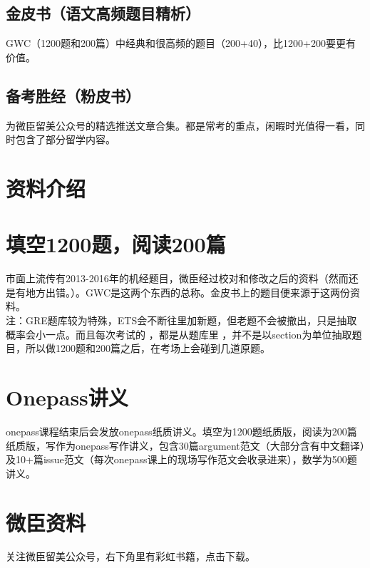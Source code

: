 \documentclass[11pt,a4paper]{article}
\begin{document}
{	\subsection{金皮书（语文高频题目精析）}GWC（1200题和200篇）中经典和很高频的题目（200+40），比1200+200要更有价值。
	
	\subsection{备考胜经（粉皮书）}为微臣留美公众号的精选推送文章合集。都是常考的重点，闲暇时光值得一看，同时包含了部分留学内容。
}
	\newpage
	
	\section{资料介绍}{
	
	\section*{填空1200题，阅读200篇}市面上流传有2013-2016年的机经题目，微臣经过校对和修改之后的资料（然而还是有地方出错。）。GWC是这两个东西的总称。金皮书上的题目便来源于这两份资料。
	\\注：GRE题库较为特殊，ETS会不断往里加新题，但老题不会被撤出，只是抽取概率会小一点。而且每次考试的
	，都是从题库里
	，并不是以section为单位抽取题目，所以做1200题和200篇之后，在考场上会碰到几道原题。
	\\
	
	\section*{Onepass讲义}onepass课程结束后会发放onepass纸质讲义。填空为1200题纸质版，阅读为200篇纸质版，写作为onepass写作讲义，包含30篇argument范文（大部分含有中文翻译）及10+篇issue范文（每次onepass课上的现场写作范文会收录进来），数学为500题讲义。
	
	\section*{微臣资料}关注微臣留美公众号，右下角里有彩虹书籍，点击下载。
}
	\newpage
	
\end{document}

